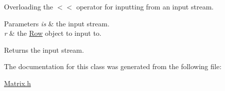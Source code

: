 Overloading the $<$$<$ operator for inputting from an input stream. 


\begin{DoxyParams}{Parameters}
{\em is} & the input stream. \\
\hline
{\em r} & the \hyperlink{class_row}{Row} object to input to. \\
\hline
\end{DoxyParams}
\begin{DoxyReturn}{Returns}
the input stream. 
\end{DoxyReturn}


The documentation for this class was generated from the following file\+:\begin{DoxyCompactItemize}
\item 
\hyperlink{_matrix_8h}{Matrix.\+h}\end{DoxyCompactItemize}
